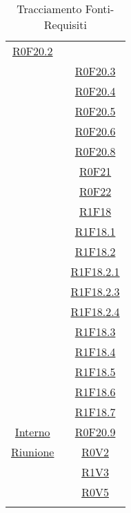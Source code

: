 \documentclass[../AnalisiDeiRequisiti.tex]{subfiles}
\begin{document}
\begin{longtable}{|c|c|}
	\hyperlink{R0F20.2}{R0F20.2}\\& \
	\hyperlink{R0F20.3}{R0F20.3}\\& \
	\hyperlink{R0F20.4}{R0F20.4}\\& \
	\hyperlink{R0F20.5}{R0F20.5}\\& \
	\hyperlink{R0F20.6}{R0F20.6}\\& \
	\hyperlink{R0F20.8}{R0F20.8}\\& \
	\hyperlink{R0F21}{R0F21}\\& \
	\hyperlink{R0F22}{R0F22}\\& \
	\hyperlink{R1F18}{R1F18}\\& \
	\hyperlink{R1F18.1}{R1F18.1}\\& \
	\hyperlink{R1F18.2}{R1F18.2}\\& \
	\hyperlink{R1F18.2.1}{R1F18.2.1}\\& \
	\hyperlink{R1F18.2.3}{R1F18.2.3}\\& \
	\hyperlink{R1F18.2.4}{R1F18.2.4}\\& \
	\hyperlink{R1F18.3}{R1F18.3}\\& \
	\hyperlink{R1F18.4}{R1F18.4}\\& \
	\hyperlink{R1F18.5}{R1F18.5}\\& \
	\hyperlink{R1F18.6}{R1F18.6}\\& \
	\hyperlink{R1F18.7}{R1F18.7}\\\hline
	\hyperlink{Interno}{Interno} & \
	\hyperlink{R0F20.9}{R0F20.9}\\\hline
	\hyperlink{Riunione}{Riunione} & \
	\hyperlink{R0V2}{R0V2}\\& \
	\hyperlink{R1V3}{R1V3}\\& \
	\hyperlink{R0V5}{R0V5}\\\hline

	\caption[Tracciamento Fonti-Requisiti]{Tracciamento Fonti-Requisiti}
	\label{tabella:fonti-requi}
\end{longtable}
\clearpage
\end{document}
